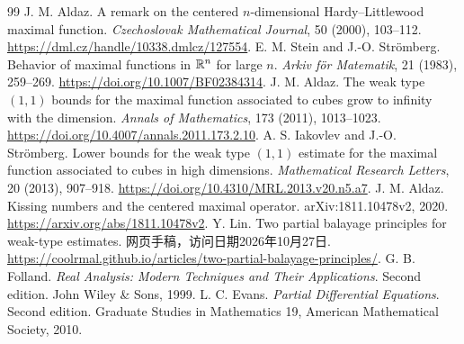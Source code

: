 \begin{thebibliography}{99}
 J. M. Aldaz. A remark on the centered $n$-dimensional Hardy--Littlewood maximal function. \emph{Czechoslovak Mathematical Journal}, 50 (2000), 103--112. \url{https://dml.cz/handle/10338.dmlcz/127554}.
 E. M. Stein and J.-O. Str\"omberg. Behavior of maximal functions in $\mathbb{R}^n$ for large $n$. \emph{Arkiv f\"or Matematik}, 21 (1983), 259--269. \url{https://doi.org/10.1007/BF02384314}.
 J. M. Aldaz. The weak type $(1,1)$ bounds for the maximal function associated to cubes grow to infinity with the dimension. \emph{Annals of Mathematics}, 173 (2011), 1013--1023. \url{https://doi.org/10.4007/annals.2011.173.2.10}.
 A. S. Iakovlev and J.-O. Str\"omberg. Lower bounds for the weak type $(1,1)$ estimate for the maximal function associated to cubes in high dimensions. \emph{Mathematical Research Letters}, 20 (2013), 907--918. \url{https://doi.org/10.4310/MRL.2013.v20.n5.a7}.
 J. M. Aldaz. Kissing numbers and the centered maximal operator. arXiv:1811.10478v2, 2020. \url{https://arxiv.org/abs/1811.10478v2}.
 Y. Lin. Two partial balayage principles for weak-type estimates. 网页手稿，访问日期2026年10月27日. \url{https://coolrmal.github.io/articles/two-partial-balayage-principles/}.
 G. B. Folland. \emph{Real Analysis: Modern Techniques and Their Applications}. Second edition. John Wiley \& Sons, 1999.
 L. C. Evans. \emph{Partial Differential Equations}. Second edition. Graduate Studies in Mathematics 19, American Mathematical Society, 2010.
\end{thebibliography}

